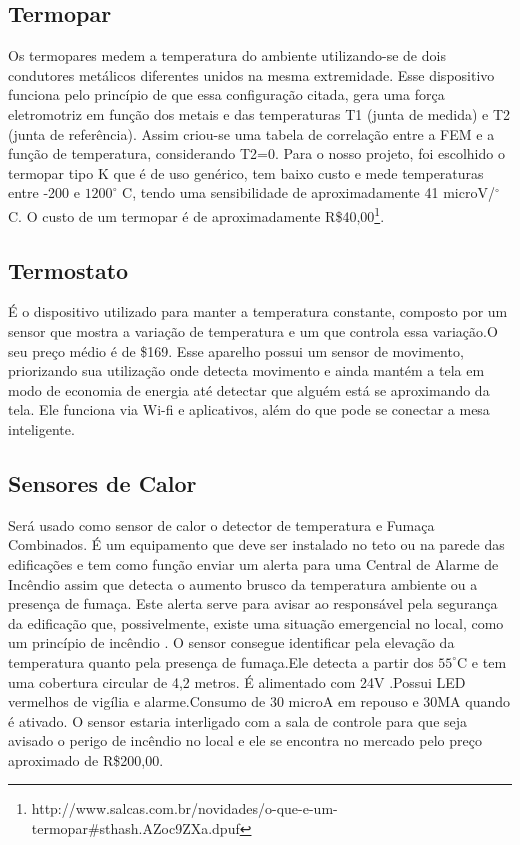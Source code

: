 \subsection{Termopar}

Os termopares medem a temperatura do ambiente utilizando-se de dois condutores metálicos diferentes unidos na mesma extremidade. Esse dispositivo funciona pelo princípio de que essa configuração citada, gera uma força eletromotriz em função dos metais e das temperaturas T1 (junta de medida) e T2 (junta de referência). Assim criou-se uma tabela de correlação entre a FEM e a função de temperatura, considerando T2=0. Para o nosso projeto, foi escolhido o termopar tipo K que é de uso genérico, tem baixo custo e mede temperaturas entre -200 e $1200^{\circ}$ C, tendo uma sensibilidade de aproximadamente 41 microV/$^{\circ}$C. O custo de um termopar é de aproximadamente R\$40,00\footnote{http://www.salcas.com.br/novidades/o-que-e-um-termopar\#sthash.AZoc9ZXa.dpuf}.
\subsection{Termostato}

É o dispositivo utilizado para manter a temperatura constante, composto por um sensor que mostra a variação de temperatura e um que controla essa variação.O seu preço médio é de \$169. Esse aparelho possui um sensor de movimento, priorizando sua utilização onde detecta movimento e ainda mantém a tela em modo de economia de energia até detectar que alguém está se aproximando da tela. Ele funciona via Wi-fi e aplicativos, além do que pode se conectar a mesa inteligente.

\subsection{Sensores de Calor}

Será usado como sensor de calor o detector de temperatura e Fumaça Combinados. É um equipamento que deve ser instalado no teto ou na parede das edificações e tem como função enviar um alerta para uma Central de Alarme de Incêndio assim que detecta o aumento brusco da temperatura ambiente ou a presença de fumaça. Este alerta serve para avisar ao responsável pela segurança da edificação que, possivelmente, existe uma situação emergencial no local, como um princípio de incêndio . O sensor consegue identificar pela elevação da temperatura quanto pela presença de fumaça.Ele detecta a partir dos $55^{\circ}$C e tem uma cobertura circular de 4,2 metros. É alimentado com 24V .Possui LED vermelhos de vigília e alarme.Consumo de 30 microA em repouso e 30MA quando é ativado. O sensor estaria interligado com a sala de controle para que seja avisado o perigo de incêndio no local e ele se encontra no mercado pelo preço aproximado de R\$200,00.

